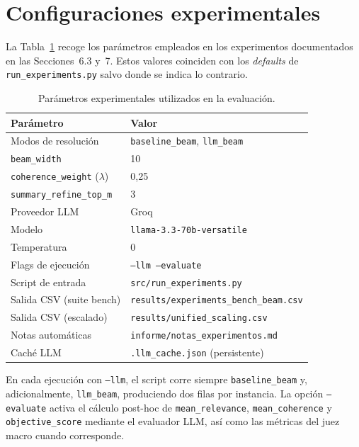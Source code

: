 \documentclass[12pt,a4paper]{article}
\begin{document}

\appendix

\section{Configuraciones experimentales}

La Tabla~\ref{tab:anexo_config} recoge los parámetros empleados en los experimentos documentados en las Secciones~6.3 y~7. Estos valores coinciden con los \textit{defaults} de \texttt{run\_experiments.py} salvo donde se indica lo contrario.

\begin{table}[H]
\centering
\caption{Parámetros experimentales utilizados en la evaluación.}
\label{tab:anexo_config}
\begin{tabular}{@{}ll@{}} \toprule
\textbf{Parámetro} & \textbf{Valor} \\ \midrule
Modos de resolución & \texttt{baseline\_beam}, \texttt{llm\_beam} \\
\texttt{beam\_width} & 10 \\
\texttt{coherence\_weight} ($\lambda$) & 0{,}25 \\
\texttt{summary\_refine\_top\_m} & 3 \\
Proveedor LLM & Groq \\
Modelo & \texttt{llama-3.3-70b-versatile} \\
Temperatura & 0 \\
Flags de ejecución & \texttt{--llm --evaluate} \\
Script de entrada & \texttt{src/run\_experiments.py} \\
Salida CSV (suite bench) & \texttt{results/experiments\_bench\_beam.csv} \\
Salida CSV (escalado) & \texttt{results/unified\_scaling.csv} \\
Notas automáticas & \texttt{informe/notas\_experimentos.md} \\
Caché LLM & \texttt{.llm\_cache.json} (persistente) \\ \bottomrule
\end{tabular}
\end{table}

En cada ejecución con \texttt{--llm}, el script corre siempre \texttt{baseline\_beam} y, adicionalmente, \texttt{llm\_beam}, produciendo dos filas por instancia. La opción \texttt{--evaluate} activa el cálculo post-hoc de \texttt{mean\_relevance}, \texttt{mean\_coherence} y \texttt{objective\_score} mediante el evaluador LLM, así como las métricas del juez macro cuando corresponde.
\end{document}

